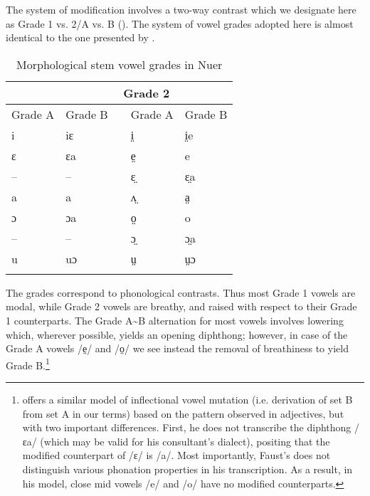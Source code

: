 \documentclass[output=paper,newtxmath,modfonts,nonflat,draftmode]{langsci/langscibook}
\begin{document}
The system of  modification involves a two-way contrast which we designate here as Grade 1 vs. 2/A vs. B (). The system of vowel grades adopted here is almost identical to the one presented by \citet{reid2016}.

\begin{table}
\begin{tabularx}{.8\textwidth}{llXll}
\lsptoprule

\multicolumn{2}{c}{Grade 1} && \multicolumn{2}{c}{Grade 2}\\
\midrule
  Grade A &  Grade B &&  Grade A &  Grade B\\
 i & iɛ && i̤ & i̤e\\
 ɛ & ɛa && e̤ & e\\
 -- & -- && ɛ̤ & ɛ̤a\\
 a & a && ʌ̤ & a̤\\
 ɔ & ɔa && o̤ & o\\
 -- & -- && ɔ̤ & ɔ̤a\\
 u & uɔ && ṳ & ṳɔ\\
\lspbottomrule
\end{tabularx}
\caption{Morphological stem vowel grades in Nuer}
\label{tab:monich:4}
\end{table}

The grades correspond to phonological contrasts. Thus most Grade 1 vowels are modal, while Grade 2 vowels are breathy, and raised with respect to their Grade 1 counterparts. The Grade A{\textasciitilde}B alternation for most vowels involves lowering which, wherever possible, yields an opening diphthong; however, in case of the Grade A vowels /e̤/ and /o̤/ we see instead the removal of breathiness to yield Grade B.\footnote{\citet{Faust2017} offers\label{fn:monich:4} a similar model of inflectional vowel mutation (i.e. derivation of set B from set A in our terms) based on the pattern observed in adjectives, but with two important differences. First, he does not transcribe the diphthong /ɛa/ (which may be valid for his consultant’s dialect), positing that the modified counterpart of /ɛ/ is /a/. Most importantly, Faust’s does not distinguish various phonation properties in his transcription. As a result, in his model, close mid vowels /e/ and /o/ have no modified counterparts.}  
\end{document}
